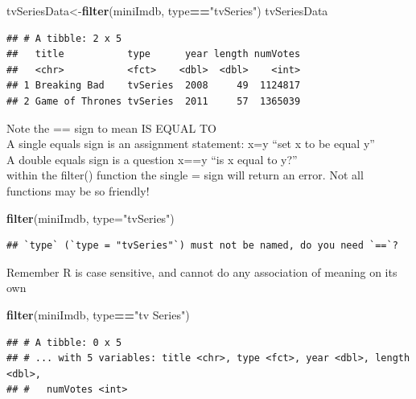 \documentclass[]{book}
\newenvironment{Shaded}{\begin{snugshade}}{\end{snugshade}}
\newcommand{\DataTypeTok}[1]{\textcolor[rgb]{0.13,0.29,0.53}{#1}}
\newcommand{\KeywordTok}[1]{\textcolor[rgb]{0.13,0.29,0.53}{\textbf{#1}}}
\newcommand{\NormalTok}[1]{#1}
\newcommand{\OperatorTok}[1]{\textcolor[rgb]{0.81,0.36,0.00}{\textbf{#1}}}
\newcommand{\StringTok}[1]{\textcolor[rgb]{0.31,0.60,0.02}{#1}}
\begin{document}
\begin{Shaded}
\begin{Highlighting}[]
\NormalTok{tvSeriesData<-}\KeywordTok{filter}\NormalTok{(miniImdb, type}\OperatorTok{==}\StringTok{"tvSeries"}\NormalTok{)}
\NormalTok{tvSeriesData}
\end{Highlighting}
\end{Shaded}

\begin{verbatim}
## # A tibble: 2 x 5
##   title           type      year length numVotes
##   <chr>           <fct>    <dbl>  <dbl>    <int>
## 1 Breaking Bad    tvSeries  2008     49  1124817
## 2 Game of Thrones tvSeries  2011     57  1365039
\end{verbatim}

Note the == sign to mean IS EQUAL TO\\
A single equals sign is an assignment statement: x=y ``set x to be equal y''\\
A double equals sign is a question x==y ``is x equal to y?''\\
within the filter() function the single = sign will return an error. Not all functions may be so friendly!

\begin{Shaded}
\begin{Highlighting}[]
\KeywordTok{filter}\NormalTok{(miniImdb, }\DataTypeTok{type=}\StringTok{"tvSeries"}\NormalTok{)}
\end{Highlighting}
\end{Shaded}

\begin{verbatim}
## `type` (`type = "tvSeries"`) must not be named, do you need `==`?
\end{verbatim}

Remember R is case sensitive, and cannot do any association of meaning on its own

\begin{Shaded}
\begin{Highlighting}[]
\KeywordTok{filter}\NormalTok{(miniImdb, type}\OperatorTok{==}\StringTok{"tv Series"}\NormalTok{)}
\end{Highlighting}
\end{Shaded}

\begin{verbatim}
## # A tibble: 0 x 5
## # ... with 5 variables: title <chr>, type <fct>, year <dbl>, length <dbl>,
## #   numVotes <int>
\end{verbatim}
\end{document}
